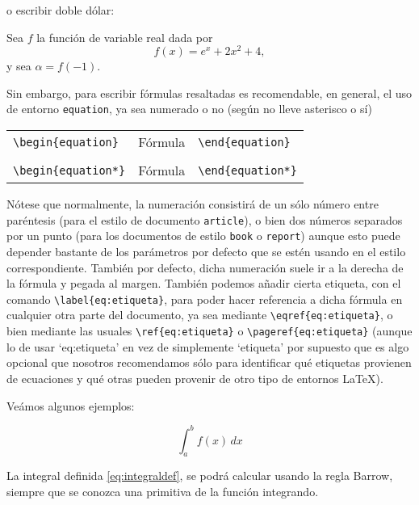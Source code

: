 \documentclass[11pt]{article}
\begin{document}
\vspace{0.5cm}
\noindent o escribir doble dólar:

\begin{Example}
  Sea $f$ la funci\'on de variable real dada por 
  $$f(x)=e^x+2x^2+4,$$ y sea $\alpha = f(-1)$.
\end{Example}

\vspace{0.5cm}

Sin embargo, para escribir fórmulas resaltadas es recomendable, en general, el uso de entorno {\tt equation}, ya sea numerado o no (según no lleve asterisco o sí)

\begin{tabular}{lll}
	\verb+\begin{equation}+           & Fórmula    &    \verb+\end{equation}+    \\
                                      &            &                             \\
	\verb+\begin{equation*}+          & Fórmula    &    \verb+\end{equation*}+ 
\end{tabular}

\vspace{1cm}

Nótese que normalmente, la numeración consistirá de un sólo número entre paréntesis (para el estilo de documento {\tt article}), o bien dos números separados por un punto (para los documentos de estilo {\tt book} o {\tt report}) aunque esto puede depender bastante de los parámetros por defecto que se estén usando en el estilo correspondiente. También por defecto, dicha numeración suele ir a la derecha de la fórmula y pegada al margen. También podemos añadir cierta etiqueta, con el comando \verb|\label{eq:etiqueta}|, para poder hacer referencia a dicha fórmula en cualquier otra parte del documento, ya sea mediante \verb|\eqref{eq:etiqueta}|, o bien mediante las usuales \verb|\ref{eq:etiqueta}| o \verb|\pageref{eq:etiqueta}| (aunque lo de usar `eq:etiqueta' en vez de simplemente `etiqueta' por supuesto que es algo opcional que nosotros recomendamos sólo para identificar qué etiquetas provienen de ecuaciones y qué otras pueden provenir de otro tipo de entornos \LaTeX).

\vspace{0.5cm}
Veámos algunos ejemplos:

\begin{Example}[gobble=0]
\begin{equation}\label{eq:integraldef}
  \int_a^b f(x)\, dx
\end{equation}

La integral definida \eqref{eq:integraldef},  se podr\'a calcular 
usando la regla Barrow, siempre que se conozca una primitiva de 
la funci\'on integrando.

\end{Example}
\end{document}
